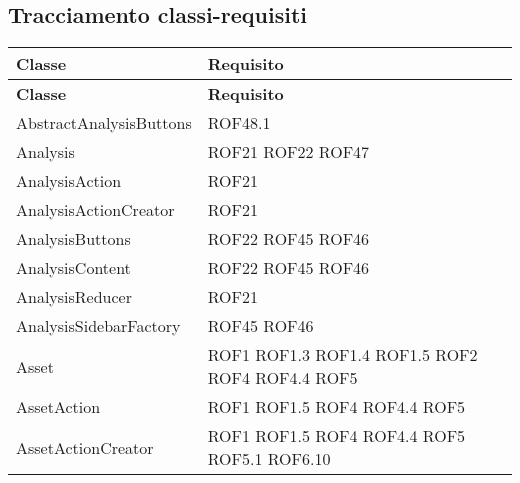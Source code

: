 	\subsection{Tracciamento classi-requisiti}
	\def\arraystretch{1.5}
	\begin{longtable}{p{5cm}!{\VRule[1pt]}p{2.5cm}}
		\color{white} \textbf{Classe} & \color{white} \textbf{Requisito} \\ 
		\endfirsthead
		\color{white} \textbf{Classe} & \color{white} \textbf{Requisito} \\ 
		\endhead
		AbstractAnalysisButtons & ROF48.1\\
		Analysis & ROF21 \newline ROF22 \newline ROF47\\
		AnalysisAction & ROF21\\
		AnalysisActionCreator & ROF21\\
		AnalysisButtons & ROF22 \newline ROF45 \newline ROF46\\
		AnalysisContent & ROF22 \newline ROF45 \newline ROF46\\
		AnalysisReducer & ROF21\\
		AnalysisSidebarFactory & ROF45 \newline ROF46\\
		Asset & ROF1 \newline ROF1.3 \newline ROF1.4 \newline ROF1.5 \newline ROF2 \newline ROF4 \newline ROF4.4 \newline ROF5\\
		AssetAction & ROF1 \newline ROF1.5 \newline ROF4 \newline ROF4.4 \newline ROF5\\
		AssetActionCreator & ROF1 \newline ROF1.5 \newline ROF4 \newline ROF4.4 \newline ROF5 \newline ROF5.1 \newline ROF6.10\\

\end{longtable}
